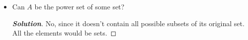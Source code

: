 \documentclass[11pt]{article}
\newenvironment{problem}[2][Problem\!]{\begin{trivlist}
\item[\hskip \labelsep {\bfseries #1}\hskip \labelsep {\bfseries #2.}]}{\end{trivlist}}
\newenvironment{solution}{\begin{proof}[\textbf{\textit{Solution}}]}{\end{proof}}
\begin{document}
\begin{problem}{1.1}
\begin{itemize}[itemsep=3em]
\item[(d)] Can $A$ be the power set of some set?
\begin{solution}\hfill %
No, since it doesn't contain all possible subsets of its original set. All the elements would be sets.
\end{solution}


\end{itemize}
\end{problem}

\newpage %
\end{document}
